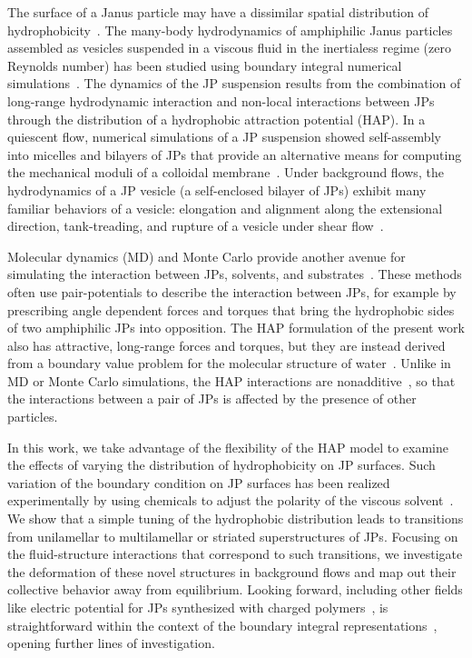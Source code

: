 \documentclass[prb,preprint,showpacs,preprintnumbers,amsmath,amssymb,longbibliography]{revtex4-1}
\begin{document}
The surface of a Janus particle may have a dissimilar spatial
distribution of hydrophobicity~\cite{doi:10.1021/la503455h}. The
many-body hydrodynamics of amphiphilic Janus particles assembled as
vesicles suspended in a viscous fluid in the inertialess regime (zero
Reynolds number) has been studied using boundary integral numerical
simulations~\cite{Fu20,Fu2022_JFM}. The dynamics of the JP suspension
results from the combination of long-range hydrodynamic interaction and
non-local interactions between JPs through the distribution of a
hydrophobic attraction potential (HAP).
%
In a quiescent flow, numerical simulations of a JP suspension showed
self-assembly into micelles and bilayers of JPs that provide an
alternative means for computing the mechanical moduli of a colloidal
membrane~\cite{NaTr00, Fu20, KrFiGuKaHa13}. Under background flows, the
hydrodynamics of a JP vesicle (a self-enclosed bilayer of JPs) exhibit
many familiar behaviors of a vesicle: elongation and alignment along the
extensional direction, tank-treading, and rupture of a vesicle under
shear flow~\cite{Fu2022_JFM, grandmaison_brancherie_salsac_2021,
D2SM00179A,keller_skalak_1982, Finken08, Shaqfeh11}.

Molecular dynamics (MD) and Monte Carlo provide another avenue for
simulating the interaction between JPs, solvents, and
substrates~\cite{Brandner2019, Baniketal2021,
HongCacciutoLuijtenGranick2008, C9NR05885K}. These methods often use
pair-potentials to describe the interaction between JPs, for example by
prescribing angle dependent forces and torques that bring the
hydrophobic sides of two amphiphilic JPs into opposition. The HAP
formulation of the present work also has attractive, long-range forces
and torques, but they are instead derived from a boundary value problem
for the molecular structure of water~\cite{Ma77, GoHaKo94, ErLjCl89,
Lietal05, Israelachvili80}. Unlike in MD or Monte Carlo simulations, the
HAP interactions are nonadditive~\cite{Fu20}, so that the interactions
between a pair of JPs is affected by the presence of other particles. 

In this work, we take advantage of the flexibility of the HAP model to
examine the effects of varying the distribution of hydrophobicity on JP
surfaces. Such variation of the boundary condition on JP surfaces has
been realized experimentally by using chemicals to adjust the polarity
of the viscous solvent~\cite{Zarzaretal2015,
KirillovaMarschelkeSynytska2019, doi:10.1021/la503455h}. We show that a
simple tuning of the hydrophobic distribution leads to transitions from
unilamellar to multilamellar or striated superstructures of JPs.
Focusing on the fluid-structure interactions that correspond to such
transitions, we investigate the deformation of these novel structures in
background flows and map out their collective behavior away from
equilibrium. Looking forward, including other fields like electric
potential for JPs synthesized with charged
polymers~\cite{HongCacciutoLuijtenGranick2008, doi:10.1021/la503455h,
KangHonciuc2018}, is straightforward within the context of the boundary
integral representations~\cite{kohl-cor-che-vee22}, opening further
lines of investigation.
\end{document}
